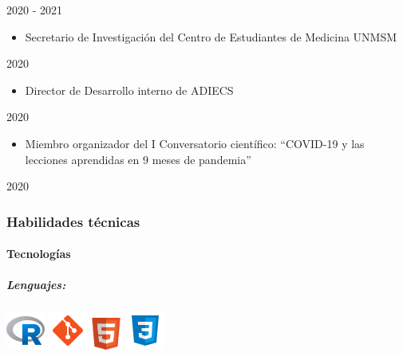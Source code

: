 \documentclass[
  letterpaper,
  DIV=11,
  numbers=noendperiod]{scrartcl}
\let\oldparagraph\paragraph
\renewcommand{\paragraph}[1]{\oldparagraph{#1}\mbox{}}
\let\oldsubparagraph\subparagraph
\renewcommand{\subparagraph}[1]{\oldsubparagraph{#1}\mbox{}}
\providecommand{\tightlist}{%
  \setlength{\itemsep}{0pt}\setlength{\parskip}{0pt}}\usepackage{longtable,booktabs,array}
\begin{document}
2020 - 2021

\begin{itemize}
\tightlist
\item
  Secretario de Investigación del Centro de Estudiantes de Medicina
  UNMSM
\end{itemize}

2020

\begin{itemize}
\tightlist
\item
  Director de Desarrollo interno de ADIECS
\end{itemize}

2020

\begin{itemize}
\tightlist
\item
  Miembro organizador del I Conversatorio científico: ``COVID-19 y las
  lecciones aprendidas en 9 meses de pandemia''
\end{itemize}

2020

\hypertarget{habilidades-tuxe9cnicas}{%
\subsubsection{Habilidades técnicas}\label{habilidades-tuxe9cnicas}}

\hypertarget{tecnologuxedas}{%
\paragraph{Tecnologías}\label{tecnologuxedas}}

\hypertarget{lenguajes}{%
\subparagraph{\texorpdfstring{\emph{Lenguajes:}}{Lenguajes:}}\label{lenguajes}}

\includegraphics{images/r-icon.png}
\includegraphics{images/git-icon.png}
\includegraphics[width=0.41667in,height=\textheight]{images/html-icon.png}
\includegraphics{images/css-icon.png}
\end{document}
